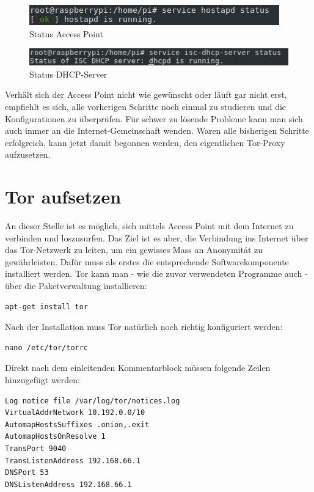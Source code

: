 \begin{figure}[H]
\centering
\includegraphics[scale=0.7]{images/hostapd_status}
\caption{Status Access Point}
\end{figure}

\begin{figure}[H]
\centering
\includegraphics[scale=0.7]{images/dhcp_status}
\caption{Status DHCP-Server}
\end{figure}

Verhält sich der Access Point nicht wie gewünscht oder läuft gar nicht erst, empfiehlt es sich, alle vorherigen Schritte noch einmal zu studieren und die Konfigurationen zu überprüfen. Für schwer zu lösende Probleme kann man sich auch immer an die Internet-Gemeinschaft wenden. Waren alle bisherigen Schritte erfolgreich, kann jetzt damit begonnen werden, den eigentlichen Tor-Proxy aufzusetzen.

\section{Tor aufsetzen}
An dieser Stelle ist es möglich, sich mittels Access Point mit dem Internet zu verbinden und loszusurfen. Das Ziel ist es aber, die Verbindung ins Internet über das Tor-Netzwerk zu leiten, um ein gewisses Mass an Anonymität zu gewährleisten. Dafür muss als erstes die entsprechende Softwarekomponente installiert werden. Tor kann man - wie die zuvor verwendeten Programme auch - über die Paketverwaltung installieren:

\begin{lstlisting}
apt-get install tor
\end{lstlisting}

Nach der Installation muss Tor natürlich noch richtig konfiguriert werden: 

\begin{lstlisting}
nano /etc/tor/torrc
\end{lstlisting} 

Direkt nach dem einleitenden Kommentarblock müssen folgende Zeilen hinzugefügt werden:

\begin{lstlisting}
Log notice file /var/log/tor/notices.log
VirtualAddrNetwork 10.192.0.0/10
AutomapHostsSuffixes .onion,.exit
AutomapHostsOnResolve 1
TransPort 9040
TransListenAddress 192.168.66.1
DNSPort 53
DNSListenAddress 192.168.66.1
\end{lstlisting}

